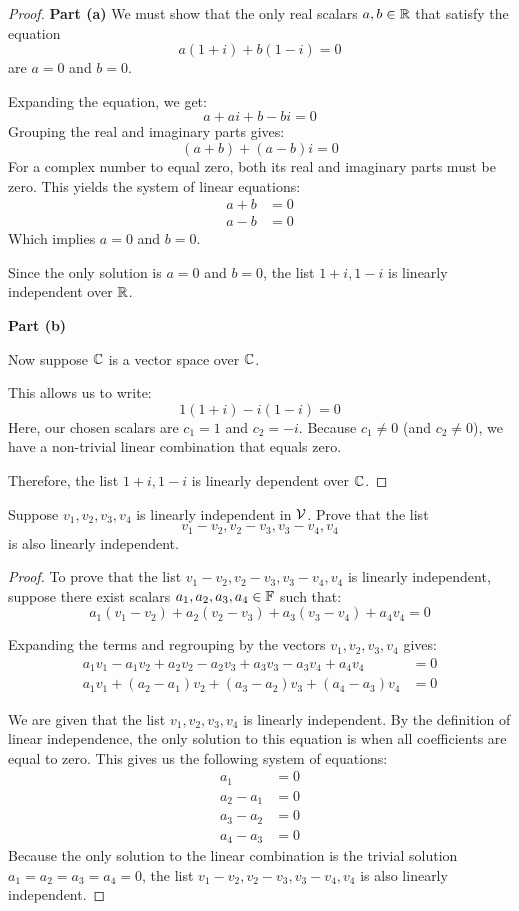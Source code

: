\begin{proof}
	\textbf{Part (a)}
	We must show that the only real scalars $a, b \in \mathbb{R}$ that satisfy the equation
	\[
	a(1 + i) + b(1 - i) = 0
	\]
	are $a = 0$ and $b = 0$. 
	
	Expanding the equation, we get:
	\[
	a + ai + b - bi = 0
	\]
	Grouping the real and imaginary parts gives:
	\[
	(a + b) + (a - b)i = 0
	\]
	For a complex number to equal zero, both its real and imaginary parts must be zero. This yields the system of linear equations:
	\begin{align*}
		a + b &= 0 \\
		a - b &= 0
	\end{align*}
	Which implies $a = 0$ and $b = 0$. 
	
	Since the only solution is $a = 0$ and $b = 0$, the list $1 + i, 1 - i$ is linearly independent over $\mathbb{R}$.
	
	\vspace{1em}
	
	\textbf{Part (b)}
	
	Now suppose $\mathbb{C}$ is a vector space over $\mathbb{C}$.
	
	This allows us to write:
	\[
	1(1 + i) - i(1 - i) = 0
	\]
	Here, our chosen scalars are $c_1 = 1$ and $c_2 = -i$. Because $c_1 \neq 0$ (and $c_2 \neq 0$), we have a non-trivial linear combination that equals zero. 
	
	Therefore, the list $1 + i, 1 - i$ is linearly dependent over $\mathbb{C}$. 
\end{proof}
\begin{question}
	Suppose $v_1, v_2, v_3, v_4$ is linearly independent in $\mathcal{V}$. Prove that the list
	\[
	v_1 - v_2, v_2 - v_3, v_3 - v_4, v_4
	\]
	is also linearly independent.
\end{question}
\begin{proof}
	To prove that the list $v_1 - v_2, v_2 - v_3, v_3 - v_4, v_4$ is linearly independent, suppose there exist scalars $a_1, a_2, a_3, a_4 \in \mathbb{F}$ such that:
	\[
	a_1(v_1 - v_2) + a_2(v_2 - v_3) + a_3(v_3 - v_4) + a_4v_4 = 0
	\]
	
	Expanding the terms and regrouping by the vectors $v_1, v_2, v_3, v_4$ gives:
	\begin{align*}
		a_1v_1 - a_1v_2 + a_2v_2 - a_2v_3 + a_3v_3 - a_3v_4 + a_4v_4 &= 0 \\
		a_1v_1 + (a_2 - a_1)v_2 + (a_3 - a_2)v_3 + (a_4 - a_3)v_4 &= 0
	\end{align*}
	
	We are given that the list $v_1, v_2, v_3, v_4$ is linearly independent. By the definition of linear independence, the only solution to this equation is when all coefficients are equal to zero. This gives us the following system of equations:
	\begin{align*}
		a_1 &= 0 \\
		a_2 - a_1 &= 0 \\
		a_3 - a_2 &= 0 \\
		a_4 - a_3 &= 0
	\end{align*}
	Because the only solution to the linear combination is the trivial solution $a_1 = a_2 = a_3 = a_4 = 0$, the list $v_1 - v_2, v_2 - v_3, v_3 - v_4, v_4$ is also linearly independent.
\end{proof}
